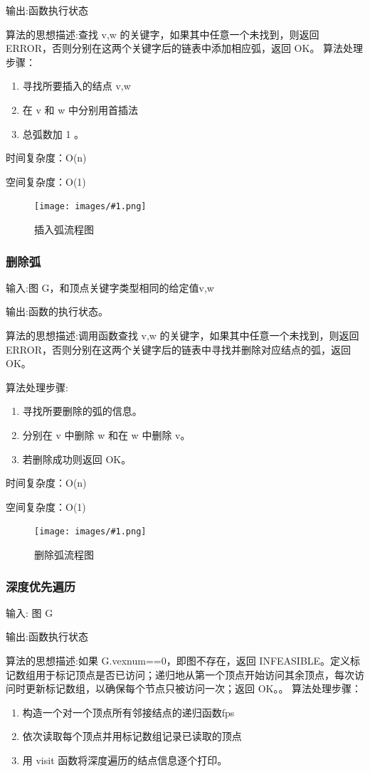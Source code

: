 \documentclass[supercite]{Experimental_Report}
\newcommand{\cfig}[3]{
	\begin{figure}[htb]
		\centering
		\texttt{[image: images/\#1.png]}
		\caption{#3}
		\label{fig:#1}
	\end{figure}
}
\theoremstyle{definition}
\begin{document}
输出:函数执行状态

算法的思想描述:查找 v,w 的关键字，如果其中任意一个未找到，则返回 ERROR，否则分别在这两个关键字后的链表中添加相应弧，返回 OK。	
算法处理步骤：
\begin{enumerate}
	\renewcommand{\labelenumi}{\theenumi)}
	\item 寻找所要插入的结点 v,w
	\item 在 v 和 w 中分别用首插法
	\item 总弧数加 1 。
\end{enumerate}

时间复杂度：O(n)

空间复杂度：O(1)
\cfig{2.3.5}{0.8}{插入弧流程图}
\subsubsection{删除弧}

输入:图 G，和顶点关键字类型相同的给定值v,w

输出:函数的执行状态。

算法的思想描述:调用函数查找 v,w 的关键字，如果其中任意一个未找到，则返回 ERROR，否则分别在这两个关键字后的链表中寻找并删除对应结点的弧，返回 OK。	

算法处理步骤:
\begin{enumerate}
	\renewcommand{\labelenumi}{\theenumi)}
	\item 寻找所要删除的弧的信息。
	\item 分别在 v 中删除 w 和在 w 中删除 v。
	\item 若删除成功则返回 OK。
\end{enumerate}

时间复杂度：O(n)

空间复杂度：O(1)
\cfig{2.3.6}{0.8}{删除弧流程图}
\clearpage
\subsubsection{深度优先遍历}
输入: 图 G

输出:函数执行状态

算法的思想描述:如果 G.vexnum==0，即图不存在，返回 INFEASIBLE。定义标记数组用于标记顶点是否已访问；递归地从第一个顶点开始访问其余顶点，每次访问时更新标记数组，以确保每个节点只被访问一次；返回 OK。。
算法处理步骤：
\begin{enumerate}
	\renewcommand{\labelenumi}{\theenumi)}
	\item  构造一个对一个顶点所有邻接结点的递归函数fps
	\item  依次读取每个顶点并用标记数组记录已读取的顶点
	\item  用 visit 函数将深度遍历的结点信息逐个打印。
\end{enumerate}
\end{document}
